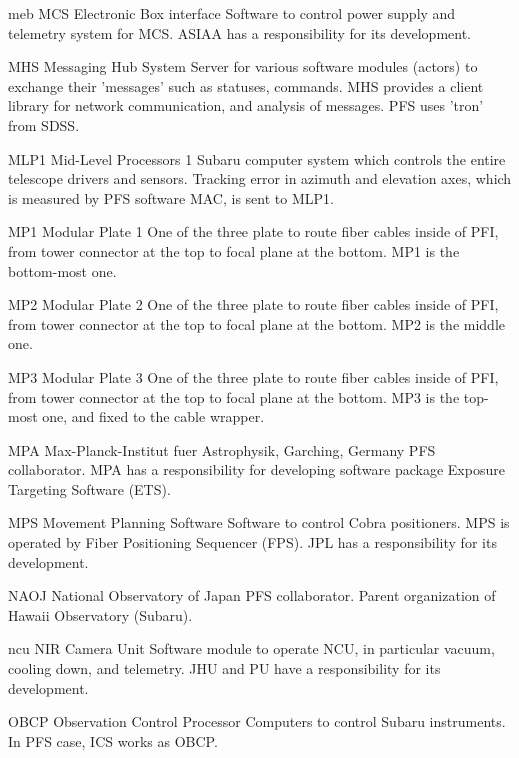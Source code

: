 {meb}
{MCS Electronic Box interface}
{Software to control power supply and telemetry system for MCS. ASIAA has a responsibility for its development.}


{MHS}
{Messaging Hub System}
{Server for various software modules (actors) to exchange their 'messages' such as statuses, commands. MHS provides a client library for network communication, and analysis of messages. PFS uses 'tron' from SDSS.}


{MLP1}
{Mid-Level Processors 1}
{Subaru computer system which controls the entire telescope drivers and sensors. Tracking error in azimuth and elevation axes, which is measured by PFS software MAC, is sent to MLP1.}


{MP1}
{Modular Plate 1}
{One of the three plate to route fiber cables inside of PFI, from tower connector at the top to focal plane at the bottom. MP1 is the bottom-most one.}


{MP2}
{Modular Plate 2}
{One of the three plate to route fiber cables inside of PFI, from tower connector at the top to focal plane at the bottom. MP2 is the middle one.}


{MP3}
{Modular Plate 3}
{One of the three plate to route fiber cables inside of PFI, from tower connector at the top to focal plane at the bottom. MP3 is the top-most one, and fixed to the cable wrapper.}


{MPA}
{Max-Planck-Institut fuer Astrophysik, Garching, Germany}
{PFS collaborator. MPA has a responsibility for developing software package Exposure Targeting Software (ETS).}


{MPS}
{Movement Planning Software}
{Software to control Cobra positioners. MPS is operated by Fiber Positioning Sequencer (FPS). JPL has a responsibility for its development.}


{NAOJ}
{National Observatory of Japan}
{PFS collaborator. Parent organization of Hawaii Observatory (Subaru).}


{ncu}
{NIR Camera Unit}
{Software module to operate NCU, in particular vacuum, cooling down, and telemetry. JHU and PU have a responsibility for its development.}


{OBCP}
{Observation Control Processor}
{Computers to control Subaru instruments. In PFS case, ICS works as OBCP.}



